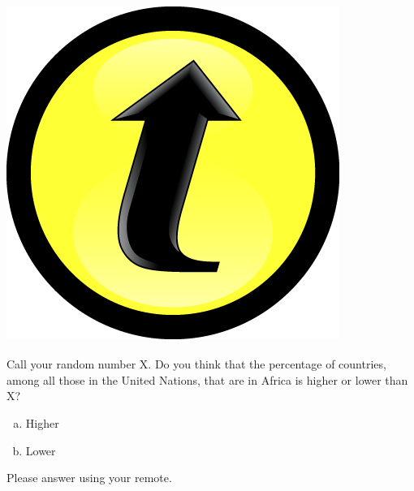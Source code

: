 \documentclass[handout]{beamer}
\begin{document}
\begin{frame}

\frametitle{\includegraphics[scale = 0.05]{./images/clicker}}

Call your random number X. Do you think that the \alert{percentage} of countries, among all those in the United Nations, that are in Africa is \alert{higher} or \alert{lower} than X?

\begin{enumerate}[(a)]
	\item Higher
	\item Lower
\end{enumerate}

Please answer using your remote.

\end{frame}

\end{document}

